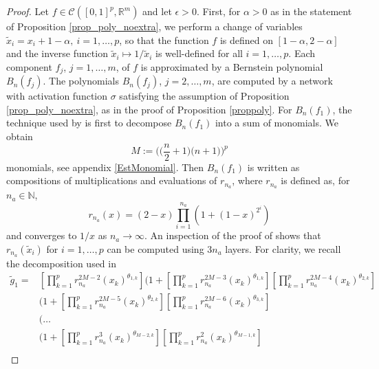 \documentclass[anon,12pt]{colt2021} %
\begin{document}
\begin{proof}
Let $f \in \mathcal{C}([0,1]^{p}, \mathbb{R}^{m})$ and let $\epsilon > 0$. First, for $\alpha > 0$ as in the statement of Proposition \ref{prop_poly_noextra}, we perform a change of variables $\tilde x_{i} = x_{i} + 1 - \alpha, \ i=1, \dots , p$,  so that the function $f$ is defined on $[1- \alpha, 2 - \alpha]$ and the inverse function $\tilde x_{i} \mapsto 1/ \tilde x_{i}$ is well-defined for all $i=1, \dots, p$. Each component $f_{j}$, $j=1, \dots, m$, of $f$ is approximated by a Bernstein polynomial $B_{n}(f_{j})$. The polynomials $B_{n}(f_{j})$, $j=2, \dots, m$, are computed by a network with activation function $\sigma$ satisfying the assumption of Proposition \ref{prop_poly_noextra}, as in the proof of Proposition \ref{proppoly}. For $B_{n}(f_{1})$, the technique used by \cite{kidger2019universal} is first to decompose $B_{n}(f_{1})$ into a sum of monomials. We obtain
\begin{equation*}
    M := \bigg( \bigg( \frac{n}{2} + 1 \bigg) \big( n + 1\big) \bigg)^{p}
\end{equation*}
monomials, see appendix \ref{EstMonomial}. Then $B_{n}(f_{1})$ is written as compositions of multiplications and evaluations of $r_{n_{a}}$, where $r_{n_{a}}$ is defined as, for $n_{a} \in \mathbb{N}$,
\begin{equation*}
    r_{n_{a}}(x) = (2-x)\prod_{i=1}^{n_{a}}(1+(1-x)^{2^{i}})
\end{equation*}
and converges to $1/x$ as $n_{a} \rightarrow \infty$. An inspection of the proof of \citep[Lemma 4.5]{kidger2019universal} shows that $r_{n_{a}}(\tilde x_{i})$ for $i=1, \dots, p$ can be computed using $3n_{a}$ layers. For clarity, we recall the decomposition used in \cite{kidger2019universal}
\begin{align} \label{decomposition}
    \tilde g_{1} = &\left[ \prod_{k=1}^{p} r_{n_{a}}^{2M-2}(x_{k})^{\theta_{1,k}} \right] \bigg( 1 + \left[\prod_{k=1}^{p} r_{n_{a}}^{2M-3}(x_{k})^{\theta_{1,k}} \right] \left[\prod_{k=1}^{p} r_{n_{a}}^{2M-4}(x_{k})^{\theta_{2,k}} \right] \nonumber \\
    & \bigg( 1 + \left[\prod_{k=1}^{p} r_{n_{a}}^{2M-5}(x_{k})^{\theta_{2,k}} \right] \left[\prod_{k=1}^{p} r_{n_{a}}^{2M-6}(x_{k})^{\theta_{3,k}} \right] \nonumber \\
    & \bigg( \dots \nonumber \\
    & \bigg( 1 + \left[\prod_{k=1}^{p} r_{n_{a}}^{3}(x_{k})^{\theta_{M-2,k}} \right] \left[\prod_{k=1}^{p} r_{n_{a}}^{2}(x_{k})^{\theta_{M-1,k}} \right] \\

\end{align}
\end{proof}
\end{document}
